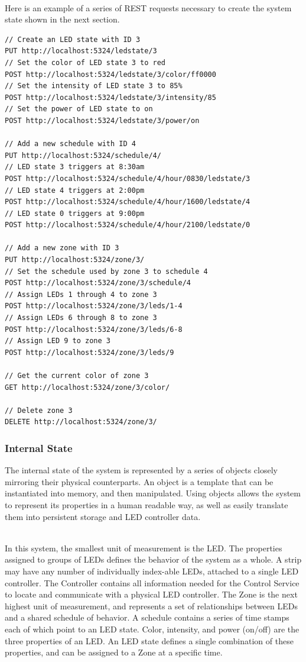 \documentclass[onecolumn, draftclsnofoot,10pt, compsoc]{IEEEtran}
\begin{document}
			\noindent \\Here is an example of a series of REST requests necessary to create the system state shown in the next section.
			\begin{lstlisting}[language=XML]
// Create an LED state with ID 3
PUT http://localhost:5324/ledstate/3
// Set the color of LED state 3 to red
POST http://localhost:5324/ledstate/3/color/ff0000
// Set the intensity of LED state 3 to 85%
POST http://localhost:5324/ledstate/3/intensity/85
// Set the power of LED state to on
POST http://localhost:5324/ledstate/3/power/on

// Add a new schedule with ID 4
PUT http://localhost:5324/schedule/4/
// LED state 3 triggers at 8:30am
POST http://localhost:5324/schedule/4/hour/0830/ledstate/3
// LED state 4 triggers at 2:00pm
POST http://localhost:5324/schedule/4/hour/1600/ledstate/4
// LED state 0 triggers at 9:00pm
POST http://localhost:5324/schedule/4/hour/2100/ledstate/0

// Add a new zone with ID 3
PUT http://localhost:5324/zone/3/
// Set the schedule used by zone 3 to schedule 4
POST http://localhost:5324/zone/3/schedule/4
// Assign LEDs 1 through 4 to zone 3
POST http://localhost:5324/zone/3/leds/1-4
// Assign LEDs 6 through 8 to zone 3
POST http://localhost:5324/zone/3/leds/6-8
// Assign LED 9 to zone 3
POST http://localhost:5324/zone/3/leds/9

// Get the current color of zone 3
GET http://localhost:5324/zone/3/color/

// Delete zone 3
DELETE http://localhost:5324/zone/3/
\end{lstlisting}

			\subsubsection{Internal State}
			The internal state of the system is represented by a series of objects closely mirroring their physical counterparts.
			An object is a template that can be instantiated into memory, and then manipulated.
			Using objects allows the system to represent its properties in a human readable way, as well as easily translate them into persistent storage and LED controller data.

			\noindent \\In this system, the smallest unit of measurement is the LED. The properties assigned to groups of LEDs defines the behavior of the system as a whole.
			A strip may have any number of individually index-able LEDs, attached to a single LED controller.
			The Controller contains all information needed for the Control Service to locate and communicate with a physical LED controller.
			The Zone is the next highest unit of measurement, and represents a set of relationships between LEDs and a shared schedule of behavior.
			A schedule contains a series of time stamps each of which point to an LED state.
			Color, intensity, and power (on/off) are the three properties of an LED. An LED state defines a single combination of these properties, and can be assigned to a Zone at a specific time.
\end{document}
